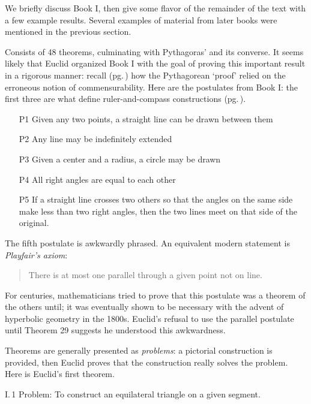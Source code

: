 We briefly discuss Book I, then give some flavor of the remainder of the text with a few example results. Several examples of material from later books were mentioned in the previous section.



Consists of 48 theorems, culminating with Pythagoras' and its converse. It seems likely that Euclid organized Book I with the goal of proving this important result in a rigorous manner: recall (pg.\,\pageref{pthagorig}) how the Pythagorean `proof' relied on the erroneous notion of commensurability. Here are the postulates from Book I: the first three are what define ruler-and-compass constructions (pg.\,\pageref{pg:construction}).

\begin{itemize}\itemsep0pt
  \item[P1] Given any two points, a straight line can be drawn between them
  \item[P2] Any line may be indefinitely extended
  \item[P3] Given a center and a radius, a circle may be drawn
  \item[P4] All right angles are equal to each other
  \item[P5] If a straight line crosses two others so that the angles on the same side make less than two right angles, then the two lines meet on that side of the original.
\end{itemize}

The fifth postulate is awkwardly phrased. An equivalent modern statement is \emph{Playfair's axiom}:
\begin{quote}
	There is at most one parallel through a given point not on line.
\end{quote}
For centuries, mathematicians tried to prove that this postulate was a theorem of the others until; it was eventually shown to be necessary with the advent of hyperbolic geometry in the 1800s. Euclid's refusal to use the parallel postulate until Theorem 29 suggests he understood this awkwardness.\smallbreak


Theorems are generally presented as \emph{problems}: a pictorial construction is provided, then Euclid proves that the construction really solves the problem. Here is Euclid's first theorem.

\begin{thm*}{I.\,1}{}\label{pg:euclidI1}
	Problem: To construct an equilateral triangle on a given segment.
\end{thm*}


